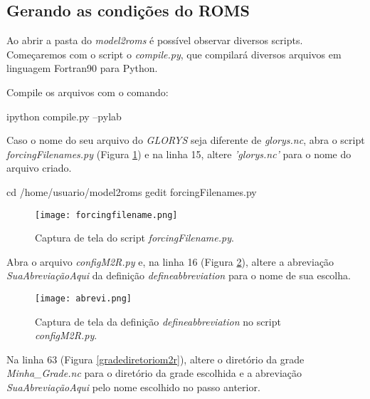 \subsection{Gerando as condições do ROMS}
\bigskip

\noindent Ao abrir a pasta do \textit{model2roms} é possível observar diversos scripts. Começaremos com o script o \textit{compile.py}, que compilará diversos arquivos em linguagem Fortran90 para Python.
\bigskip

\noindent Compile os arquivos com o comando:
\bigskip

\begin{bashcode}
ipython compile.py --pylab
\end{bashcode}
\bigskip

\noindent Caso o nome do seu arquivo do \textit{GLORYS} seja diferente de \textit{glorys.nc}, abra o script \textit{forcingFilenames.py} (Figura \textcolor{bleu_cite}{\ref{forcingfilename}}) e na linha 15, altere \textit{'glorys.nc'} para o nome do arquivo criado.
\bigskip

\begin{bashcode}
cd /home/usuario/model2roms
gedit forcingFilenames.py
\end{bashcode}
\bigskip

\begin{figure}[H]
    \centering
    \texttt{[image: forcingfilename.png]}
    \caption{Captura de tela do script \textit{forcingFilename.py}.}
    \label{forcingfilename}
\end{figure}
\bigskip

\noindent Abra o arquivo \textit{configM2R.py} e, na linha 16 (Figura \textcolor{bleu_cite}{\ref{abrev}}), altere a abreviação \textit{SuaAbreviaçãoAqui} da definição \textit{defineabbreviation} para o nome de sua escolha.
\bigskip

\begin{figure}[H]
    \centering
    \texttt{[image: abrevi.png]}
    \caption{Captura de tela da definição \textit{defineabbreviation} no script \textit{configM2R.py}.}
    \label{abrev}
\end{figure}
\bigskip

\noindent Na linha 63 (Figura \textcolor{bleu_cite}{\ref{gradediretoriom2r}}), altere o diretório da grade \textit{Minha\_Grade.nc} para o diretório da grade escolhida e a abreviação \textit{SuaAbreviaçãoAqui} pelo nome escolhido no passo anterior.
\bigskip

